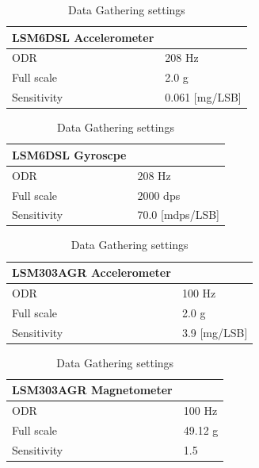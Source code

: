 \begin{table}[H]
	\begin{subtable}[H]{0.45\textwidth}
		\begin{tabular}{||p{6cm}|p{2cm}||}
			\hline
			\textbf{LSM6DSL Accelerometer} 	& 				 		\T\B  \\ 
			\hline
			ODR				  				& 	    208 Hz 	 		\T\B  \\
			Full scale						&	    2.0 g 	 		 \T\B  \\
			Sensitivity						& 		0.061	\tiny[mg/LSB]	 \T\B  \\
			\hline
		\end{tabular}
		\vspace{10pt}
	\end{subtable}
	\hfill
	\begin{subtable}[H]{0.45\textwidth}
		\begin{tabular}{||p{6cm}|p{2cm}||}
			\hline
			\textbf{LSM6DSL Gyroscpe} 	& 				 	 				 \T\B  \\ 
			\hline
			ODR				  				& 	    208 Hz 	 				 \T\B  \\
			Full scale						&	    2000 dps 				 \T\B  \\
			Sensitivity						& 		70.0 \tiny[mdps/LSB]	 \T\B  \\
			\hline
		\end{tabular}
	\vspace{10pt}
	\end{subtable}

	\begin{subtable}[H]{0.45\textwidth}
		\begin{tabular}{||p{6cm}|p{2cm}||}
			\hline
			\textbf{LSM303AGR Accelerometer} 	& 				 \T\B  \\ 
			\hline
			ODR				  				& 	    100 Hz 		 \T\B  \\
			Full scale						&	    2.0 g 	 	 \T\B  \\
			Sensitivity						& 		3.9	\tiny[mg/LSB] 	 \T\B  \\
			\hline
		\end{tabular}
		\vspace{10pt}
	\end{subtable}
	\hfill
	\begin{subtable}[H]{0.45\textwidth}
		\begin{tabular}{||p{6cm}|p{2cm}||}
			\hline 
			\textbf{LSM303AGR Magnetometer} & 				 	 \T\B  \\ 
			\hline
			ODR				  				& 	    100 Hz 	 	 \T\B  \\
			Full scale						&	    49.12 g 	 \T\B  \\
			Sensitivity						& 		1.5	 		 \T\B  \\
			\hline
		\end{tabular}
		\vspace{10pt}
	\end{subtable}
	\centering
	\caption{Data Gathering settings}\label{tab:1}
\end{table}
